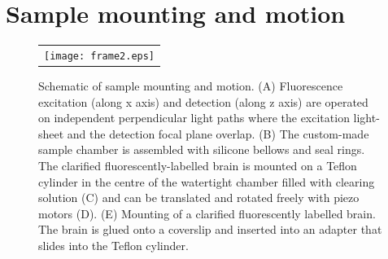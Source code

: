 \documentclass[12pt]{spieman}  %
\begin{document}
\section{Sample mounting and motion}
\label{sec:mounting}
%
		
\begin{figure}
   \begin{center}
   \begin{tabular}{c}
   \texttt{[image: frame2.eps]}
   \end{tabular}
   \end{center}
   \caption{\label{fig:frame2} Schematic of sample mounting and motion. (A) Fluorescence excitation (along x axis) and detection (along z axis) are operated on independent perpendicular light paths where the excitation light-sheet and the detection focal plane overlap. (B) The custom-made sample chamber is assembled with silicone bellows and seal rings. The clarified fluorescently-labelled brain is mounted on a Teflon cylinder in the centre of the watertight chamber filled with clearing solution (C) and can be translated and rotated freely with piezo motors (D). (E) Mounting of a clarified fluorescently labelled brain. The brain is glued onto a coverslip and inserted into an adapter that slides into the Teflon cylinder.} 
   \end{figure}		
\end{document}
